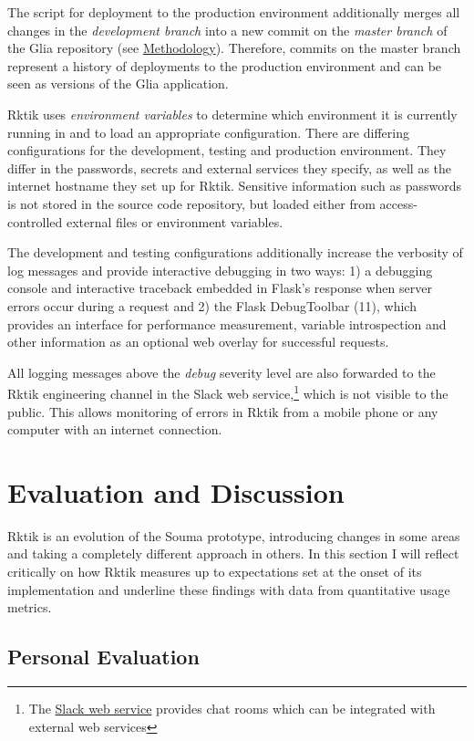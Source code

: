 The script for deployment to the production environment additionally
merges all changes in the \emph{development branch} into a new commit on
the \emph{master branch} of the Glia repository (see
\hyperref[methodology]{Methodology}). Therefore, commits on the master
branch represent a history of deployments to the production environment
and can be seen as versions of the Glia application.

Rktik uses \emph{environment variables} to determine which environment
it is currently running in and to load an appropriate configuration.
There are differing configurations for the development, testing and
production environment. They differ in the passwords, secrets and
external services they specify, as well as the internet hostname they
set up for Rktik. Sensitive information such as passwords is not stored
in the source code repository, but loaded either from access-controlled
external files or environment variables.

The development and testing configurations additionally increase the
verbosity of log messages and provide interactive debugging in two ways:
1) a debugging console and interactive traceback embedded in Flask's
response when server errors occur during a request and 2) the Flask
DebugToolbar (11), which provides an interface for performance
measurement, variable introspection and other information as an optional
web overlay for successful requests.

All logging messages above the \emph{debug} severity level are also
forwarded to the Rktik engineering channel in the Slack web
service,\footnote{The \href{https://slack.com}{Slack web service}
  provides chat rooms which can be integrated with external web services}
which is not visible to the public. This allows monitoring of errors in
Rktik from a mobile phone or any computer with an internet connection.

\chapter{Evaluation and Discussion}\label{evaluation-and-discussion}

Rktik is an evolution of the Souma prototype, introducing changes in
some areas and taking a completely different approach in others. In this
section I will reflect critically on how Rktik measures up to
expectations set at the onset of its implementation and underline these
findings with data from quantitative usage metrics.

\section{Personal Evaluation}\label{personal-evaluation}

